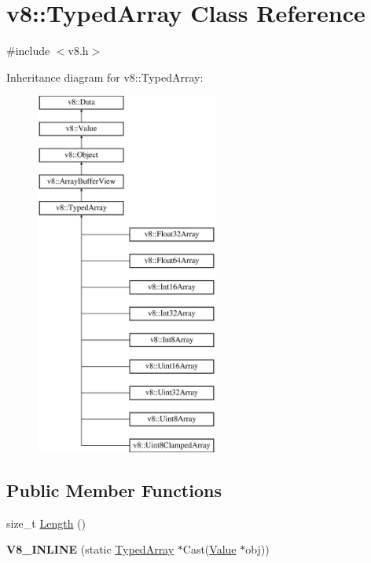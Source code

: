 \hypertarget{classv8_1_1_typed_array}{}\section{v8\+:\+:Typed\+Array Class Reference}
\label{classv8_1_1_typed_array}


{\ttfamily \#include $<$v8.\+h$>$}

Inheritance diagram for v8\+:\+:Typed\+Array\+:\begin{figure}[H]
\begin{center}
\leavevmode
\includegraphics[height=12.000000cm]{classv8_1_1_typed_array}
\end{center}
\end{figure}
\subsection*{Public Member Functions}
\begin{DoxyCompactItemize}
\item 
size\+\_\+t \hyperlink{classv8_1_1_typed_array_abb1047225d53d960c0da9c9f83cd7042}{Length} ()
\item 
\hypertarget{classv8_1_1_typed_array_a788c8a87a3561bc9c30c87a1024d3bd6}{}{\bfseries V8\+\_\+\+I\+N\+L\+I\+N\+E} (static \hyperlink{classv8_1_1_typed_array}{Typed\+Array} $\ast$Cast(\hyperlink{classv8_1_1_value}{Value} $\ast$obj))\label{classv8_1_1_typed_array_a788c8a87a3561bc9c30c87a1024d3bd6}

\end{DoxyCompactItemize}
